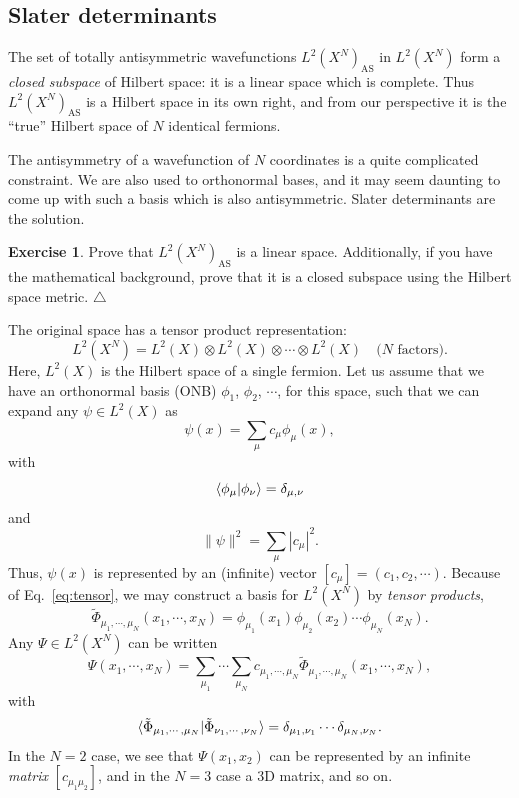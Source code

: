 \documentclass{report}
\theoremstyle{plain}
\theoremstyle{definition}
\newtheorem{exerc}{Exercise}[chapter]
\newcommand\xqed[1]{%
  \leavevmode\unskip\penalty9999 \hbox{}\nobreak\hfill
  \quad\hbox{#1}}
\newcommand\demo{\xqed{$\triangle$}}
\newenvironment{exercise}{\bigskip\begin{exerc}}{\demo\end{exerc}\bigskip}
\begin{document}
\subsection{Slater determinants}

The set of totally antisymmetric wavefunctions $L^2(X^N)_\text{AS}$ in
$L^2(X^N)$ form a \emph{closed
  subspace} of Hilbert space: it is a linear space which is
complete. Thus $L^2(X^N)_\text{AS}$ is a Hilbert space in its own
right, and from our perspective it is the ``true'' Hilbert space of
$N$ identical fermions.

The antisymmetry of a wavefunction of $N$ coordinates is a quite
complicated constraint. We are also used to orthonormal bases, and it
may seem daunting to come up with such a basis which is also
antisymmetric. Slater determinants are the solution.

\begin{exercise}
  Prove that $L^2(X^N)_\text{AS}$ is a linear space. Additionally, if
  you have the mathematical background, prove that it is a closed
  subspace using the Hilbert space metric.
\end{exercise}

The original space has a tensor product representation:
\begin{equation}
  L^2(X^N) = L^2(X) \otimes L^2(X) \otimes \cdots \otimes L^2(X) \quad
  \text{($N$ factors)}. \label{eq:tensor}
\end{equation}
Here, $L^2(X)$ is the Hilbert space of a single fermion. Let us assume
that we have an orthonormal basis (ONB) $\phi_1$, $\phi_2$, $\cdots$,
for this space, such that we can expand any $\psi \in L^2(X)$ as
\begin{equation}
  \psi(x) = \sum_\mu c_\mu \phi_\mu(x),
\end{equation}
with
\begin{equation}
  \braket{\phi_\mu|\phi_\nu} = \delta_{\mu,\nu}
\end{equation}
and
\begin{equation}
  \|\psi\|^2 = \sum_\mu |c_\mu|^2.
\end{equation}
Thus, $\psi(x)$ is represented by an (infinite) vector $[c_\mu] = (c_1,c_2,\cdots)$.
Because of Eq.~\eqref{eq:tensor}, we may construct a basis for
$L^2(X^N)$ by \emph{tensor products},
\begin{equation}
  \tilde{\Phi}_{\mu_1,\cdots,\mu_N}(x_1,\cdots,x_N) = \phi_{\mu_1}(x_1)\phi_{\mu_2}(x_2)\cdots\phi_{\mu_N}(x_N).
\end{equation}
Any $\Psi \in L^2(X^N)$ can be written
\begin{equation}
  \Psi(x_1,\cdots,x_N) = \sum_{\mu_1}\cdots\sum_{\mu_N}
  c_{\mu_1,\cdots,\mu_N} \tilde{\Phi}_{\mu_1,\cdots,\mu_N}(x_1,\cdots,x_N),
\end{equation}
with
\begin{equation}
  \braket{\tilde{\Phi}_{\mu_1,\cdots,\mu_N}|\tilde{\Phi}_{\nu_1,\cdots,\nu_N}} = \delta_{\mu_1,\nu_1}\cdots\delta_{\mu_N,\nu_N}.
\end{equation}
In the $N=2$ case, we see that $\Psi(x_1,x_2)$ can be represented by
an infinite \emph{matrix} $[c_{\mu_1\mu_2}]$, and in the $N=3$ case a
3D matrix, and so on.
\end{document}
